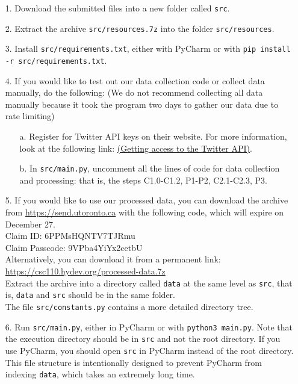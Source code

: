 \documentclass{article}
\begin{document}
    \begin{itemize}
        \item [1. ] Download the submitted files into a new folder called \verb|src|.
        
        \item [2. ] Extract the archive \verb|src/resources.7z| into the folder \verb|src/resources|.
        
        \item [3. ] Install \verb|src/requirements.txt|, either with PyCharm or with \texttt{pip install -r src/requirements.txt}.
        
        \item [4. ] If you would like to test out our data collection code or collect data manually, do the following: (We do not recommend collecting all data manually because it took the program two days to gather our data due to rate limiting)
        
        \begin{itemize}
            \item [a. ] Register for Twitter API keys on their website. For more information, look at the following link: \href{https://developer.twitter.com/en/docs/twitter-api/getting-started/getting-access-to-the-twitter-api}{(Getting access to the Twitter API)}.
            \item [b. ] In \verb|src/main.py|, uncomment all the lines of code for data collection and processing: that is, the steps C1.0-C1.2, P1-P2, C2.1-C2.3, P3.
        \end{itemize}
        
        \item [5. ] If you would like to use our processed data, you can download the archive from \url{https://send.utoronto.ca} with the following code, which will expire on December 27.\\
        Claim ID: 6PPMsHQNTV7TJRmu\\
        Claim Passcode: 9VPba4YiYx2cetbU\\
        Alternatively, you can download it from a permanent link: \url{https://csc110.hydev.org/processed-data.7z}\\
        Extract the archive into a directory called \verb|data| at the same level as \verb|src|, that is, \verb|data| and \verb|src| should be in the same folder.\\
        The file \verb|src/constants.py| contains a more detailed directory tree.
        
        \item [6. ] Run \verb|src/main.py|, either in PyCharm or with \texttt{python3 main.py}. Note that the execution directory should be in \verb|src| and not the root directory. If you use PyCharm, you should open \verb|src| in PyCharm instead of the root directory. This file structure is intentionally designed to prevent PyCharm from indexing \verb|data|, which takes an extremely long time.
        
    \end{itemize}
\end{document}
